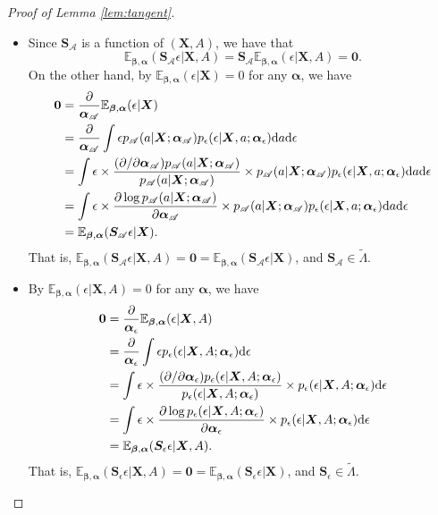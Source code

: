 \documentclass[11pt]{article}
\numberwithin{equation}{section}
\theoremstyle{definition}
\theoremstyle{remark}
\newcommand{\bS}{\bm{S}}
\newcommand{\bX}{\bm{X}}
\newcommand{\bbeta}{\bm{\beta}}
\newcommand{\balpha}{\bm{\alpha}}
\newcommand{\bbE}{\mathbb{E}}
\newcommand{\sA}{\mathscr{A}}
\newcommand{\bzero}{\mathbf{0}}	%
\newcommand{\rd}{\mathrm{d}}
\begin{document}
\begin{proof}[Proof of Lemma \ref{lem:tangent}]
\begin{itemize}
		\item Since $ \bS_{\sA} $ is a function of $ (\bX,A) $, we have that
		\[ \bbE_{\bbeta,\balpha}(\bS_{\sA}\epsilon|\bX,A) = \bS_{\sA}\bbE_{\bbeta,\balpha}(\epsilon|\bX,A) = \bzero. \]
		On the other hand, by $ \bbE_{\bbeta,\balpha}(\epsilon|\bX) = 0 $ for any $ \balpha $, we have
		\begin{align*}
			\bzero &= {\partial \over \balpha_{\sA}}\bbE_{\bbeta,\balpha}(\epsilon|\bX) \\
			&= {\partial \over \balpha_{\sA}}\int \epsilon p_{\sA}(a|\bX;\balpha_{\sA})p_{\epsilon}(\epsilon|\bX,a;\balpha_{\epsilon})\rd a\rd \epsilon\\
			&= \int \epsilon \times {{(\partial/\partial\balpha_{\sA})}p_{\sA}(a|\bX;\balpha_{\sA}) \over p_{\sA}(a|\bX;\balpha_{\sA})} \times p_{\sA}(a|\bX;\balpha_{\sA})p_{\epsilon}(\epsilon|\bX,a;\balpha_{\epsilon})\rd a\rd \epsilon \\
			&= \int \epsilon \times {\partial \log p_{\sA}(a|\bX;\balpha_{\sA}) \over \partial \balpha_{\sA}} \times p_{\sA}(a|\bX;\balpha_{\sA})p_{\epsilon}(\epsilon|\bX,a;\balpha_{\epsilon})\rd a\rd \epsilon \\
			&= \bbE_{\bbeta,\balpha}(\bS_{\sA}\epsilon|\bX).
		\end{align*}
		That is, $ \bbE_{\bbeta,\balpha}(\bS_{\sA}\epsilon|\bX,A) = \bzero = \bbE_{\bbeta,\balpha}(\bS_{\sA}\epsilon|\bX) $, and $ \bS_{\sA} \in \widetilde{\Lambda} $.
		
		\item By $ \bbE_{\bbeta,\balpha}(\epsilon|\bX,A) = 0 $ for any $ \balpha $, we have
		\begin{align*}
			\bzero &= {\partial \over \balpha_{\epsilon}}\bbE_{\bbeta,\balpha}(\epsilon|\bX,A) \\
			&= {\partial \over \balpha_{\epsilon}}\int \epsilon p_{\epsilon}(\epsilon|\bX,A;\balpha_{\epsilon})\rd \epsilon\\
			&= \int \epsilon \times {{(\partial/\partial\balpha_{\epsilon})}p_{\epsilon}(\epsilon|\bX,A;\balpha_{\epsilon}) \over p_{\epsilon}(\epsilon|\bX,A;\balpha_{\epsilon})} \times p_{\epsilon}(\epsilon|\bX,A;\balpha_{\epsilon})\rd \epsilon\\
			&= \int \epsilon \times {\partial \log p_{\epsilon}(\epsilon|\bX,A;\balpha_{\epsilon}) \over \partial \balpha_{\epsilon}} \times p_{\epsilon}(\epsilon|\bX,A;\balpha_{\epsilon})\rd \epsilon \\
			&= \bbE_{\bbeta,\balpha}(\bS_{\epsilon}\epsilon|\bX,A).
		\end{align*}
		That is, $ \bbE_{\bbeta,\balpha}(\bS_{\epsilon}\epsilon|\bX,A) = \bzero = \bbE_{\bbeta,\balpha}(\bS_{\epsilon}\epsilon|\bX) $, and $ \bS_{\epsilon} \in \widetilde{\Lambda} $.
		

\end{itemize}
\end{proof}
\end{document}
